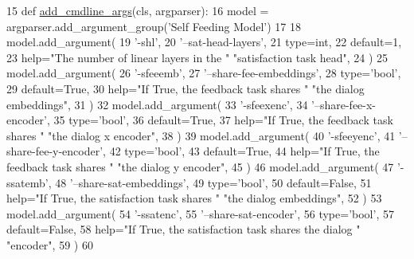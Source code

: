 \begin{DoxyCode}
15     \textcolor{keyword}{def }\hyperlink{namespaceparlai_1_1agents_1_1drqa_1_1config_a62fdd5554f1da6be0cba185271058320}{add\_cmdline\_args}(cls, argparser):
16         model = argparser.add\_argument\_group(\textcolor{stringliteral}{'Self Feeding Model'})
17 
18         model.add\_argument(
19             \textcolor{stringliteral}{'-shl'},
20             \textcolor{stringliteral}{'--sat-head-layers'},
21             type=int,
22             default=1,
23             help=\textcolor{stringliteral}{"The number of linear layers in the "} \textcolor{stringliteral}{"satisfaction task head"},
24         )
25         model.add\_argument(
26             \textcolor{stringliteral}{'-sfeeemb'},
27             \textcolor{stringliteral}{'--share-fee-embeddings'},
28             type=\textcolor{stringliteral}{'bool'},
29             default=\textcolor{keyword}{True},
30             help=\textcolor{stringliteral}{"If True, the feedback task shares "} \textcolor{stringliteral}{"the dialog embeddings"},
31         )
32         model.add\_argument(
33             \textcolor{stringliteral}{'-sfeexenc'},
34             \textcolor{stringliteral}{'--share-fee-x-encoder'},
35             type=\textcolor{stringliteral}{'bool'},
36             default=\textcolor{keyword}{True},
37             help=\textcolor{stringliteral}{"If True, the feedback task shares "} \textcolor{stringliteral}{"the dialog x encoder"},
38         )
39         model.add\_argument(
40             \textcolor{stringliteral}{'-sfeeyenc'},
41             \textcolor{stringliteral}{'--share-fee-y-encoder'},
42             type=\textcolor{stringliteral}{'bool'},
43             default=\textcolor{keyword}{True},
44             help=\textcolor{stringliteral}{"If True, the feedback task shares "} \textcolor{stringliteral}{"the dialog y encoder"},
45         )
46         model.add\_argument(
47             \textcolor{stringliteral}{'-ssatemb'},
48             \textcolor{stringliteral}{'--share-sat-embeddings'},
49             type=\textcolor{stringliteral}{'bool'},
50             default=\textcolor{keyword}{False},
51             help=\textcolor{stringliteral}{"If True, the satisfaction task shares "} \textcolor{stringliteral}{"the dialog embeddings"},
52         )
53         model.add\_argument(
54             \textcolor{stringliteral}{'-ssatenc'},
55             \textcolor{stringliteral}{'--share-sat-encoder'},
56             type=\textcolor{stringliteral}{'bool'},
57             default=\textcolor{keyword}{False},
58             help=\textcolor{stringliteral}{"If True, the satisfaction task shares the dialog "} \textcolor{stringliteral}{"encoder"},
59         )
60 
\end{DoxyCode}
\mbox{\label{classprojects_1_1self__feeding_1_1modules_1_1SelfFeedingModel_a3a6660541d656fcc763ee0b712902e60}} 
